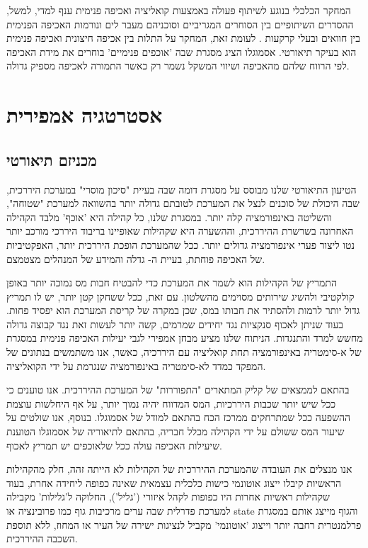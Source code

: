 המחקר הכלכלי בנוגע לשיתוף פעולה באמצעות קואליציה ואכיפה פנימית ענף למדי, למשל, ההסדרים השיתופיים בין הסוחרים המגריביים וסוכניהם מעבר לים  ונורמות האכיפה הפנימית בין חוואים ובעלי קרקעות . לעומת זאת, המחקר על התלות בין אכיפה חיצונית ואכיפה פנימית הוא בעיקר תיאורטי.
 אסמוגלו   הציג מסגרת שבה 'אוכפים פנימיים' בוחרים את מידת האכיפה לפי הרווח שלהם מהאכיפה ושיווי המשקל נשמר רק כאשר התמורה לאכיפה מספיק גדולה.


\section{אסטרטגיה אמפירית}

\subsection{מכניזם תיאורטי}

הטיעון התיאורטי שלנו מבוסס על מסגרת דומה שבה בעיית "סיכון מוסרי" במערכת היררכית, שבה היכולת של סוכנים לנצל את המערכת לטובתם גדולה יותר בהשוואה למערכת "שטוחה", והשליטה באינפורמציה קלה יותר. במסגרת שלנו, כל קהילה היא 'אוכף' מלבד הקהילה האחרונה בשרשרת ההיררכית, וההשערה  היא שקהילות שאופיינו בריבוד היררכי מורכב יותר נטו ליצור פערי אינפורמציה גדולים יותר. ככל שהמערכת הופכת היררכית יותר, האפקטיביות של האכיפה פוחתת, בעיית ה- גדלה והמידע של המנהלים מצטמצם.

התמריץ של הקהילות הוא לשמר את המערכת כדי להבטיח חבות מס נמוכה יותר באופן קולקטיבי ולהשיג שירותים מסוימים מהשלטון. עם זאת, ככל ששחקן קטן יותר, יש לו תמריץ גדול יותר לרמות ולהסתיר את חבותו במס, שכן במקרה של קריסת המערכת הוא יפסיד פחות. בעוד שניתן לאכוף סנקציות נגד יחידים שמרמים, קשה יותר לעשות זאת נגד קבוצה גדולה מחשש למרד והתנגדות. הניתוח שלנו מציע מבחן אמפירי לגבי יעילות האכיפה פנימית במסגרת של א-סימטריה באינפורמציה תחת קואליציה עם היררכיה, כאשר, אנו משתמשים בנתונים של המפקד כמדד לא-סימטריה באינפורמציה שנגרמת על ידי הקואליציה. 

בהתאם לממצאים של קליק המתארים "התפוררות" של המערכת ההיררכית. אנו טוענים כי ככל שיש יותר שכבות היררכיות, המס המדווח יהיה נמוך יותר, על אף היחלשות עוצמת ההשפעה ככל שמתרחקים ממרכז הכח בהתאם למודל של אסמוגלו. בנוסף, אנו שולטים על שיעור המס ששולם על ידי הקהילה מכלל חבריה, בהתאם לתיאוריה של אסמוגלו הטוענת שיעילות האכיפה עולה ככל שלאוכפים יש תמריץ לאכוף.

אנו מנצלים את העובדה שהמערכת ההיררכית של הקהילות לא הייתה זהה, חלק מהקהילות הראשיות קיבלו ייצוג אוטונמי כישות כלכלית עצמאית שאינה כפופה ליחידה אחרת, בעוד שקהילות ראשיות אחרות היו כפופות לקהל איזורי ('גליל'),  החלוקה ל'גלילות' מקבילה למערכת פדרלית שבה ערים מרכיבות גוף כמו פרובינציה או state והגוף מייצג אותם במסגרת פרלמנטרית רחבה יותר וייצוג 'אוטונמי' מקביל לנציגות ישירה של העיר או המחוז, ללא תוספת השכבה ההיררכית. 

